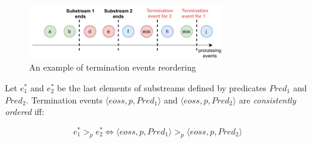 \begin{figure}[t]
  \centering
  \includegraphics[width=0.75\textwidth]{Chapters/SubstreamConsistency/pics/notifications-reordering.pdf}
  \caption{An example of termination events reordering}
  \label{notifications_reordering}
\end{figure}

\begin{definition}
Let $e^{*}_1$ and $e^{*}_2$ be the last elements of substreams defined by predicates $Pred_1$ and $Pred_2$. Termination events $\langle eoss, p, Pred_1\rangle$ and $\langle eoss, p, Pred_2\rangle$ are {\em consistently ordered} iff:

\begin{equation}
e^{*}_1 >_p e^{*}_2 \Leftrightarrow \langle eoss, p, Pred_1\rangle >_p \langle eoss, p, Pred_2\rangle
\end{equation}
\end{definition}
